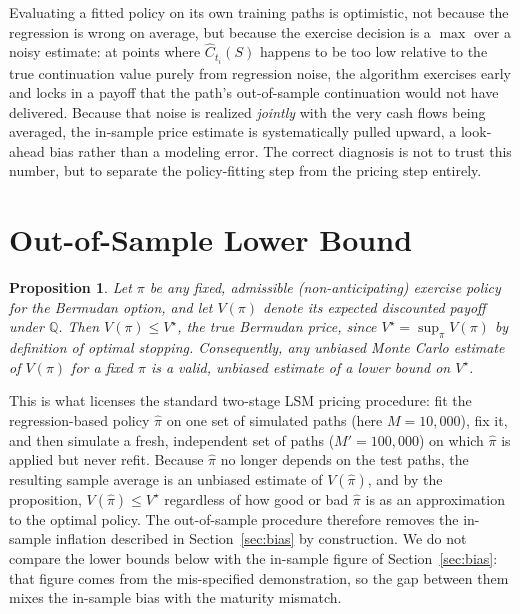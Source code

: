 \documentclass[11pt]{article}
\newtheorem{proposition}{Proposition}
\begin{document}
Evaluating a fitted policy on its own training paths is optimistic, not because the regression is wrong on average, but because the exercise decision is a $\max$ over a noisy estimate: at points where $\widehat C_{t_i}(S)$ happens to be too low relative to the true continuation value purely from regression noise, the algorithm exercises early and locks in a payoff that the path's out-of-sample continuation would not have delivered. Because that noise is realized \emph{jointly} with the very cash flows being averaged, the in-sample price estimate is systematically pulled upward, a look-ahead bias rather than a modeling error. The correct diagnosis is not to trust this number, but to separate the policy-fitting step from the pricing step entirely.

\section{Out-of-Sample Lower Bound}
\label{sec:lowerbound}

\begin{proposition}
Let $\pi$ be any fixed, admissible (non-anticipating) exercise policy for the Bermudan option, and let $V(\pi)$ denote its expected discounted payoff under $\mathbb{Q}$. Then $V(\pi) \le V^\star$, the true Bermudan price, since $V^\star = \sup_\pi V(\pi)$ by definition of optimal stopping. Consequently, any unbiased Monte Carlo estimate of $V(\pi)$ for a fixed $\pi$ is a valid, unbiased estimate of a lower bound on $V^\star$.
\end{proposition}

This is what licenses the standard two-stage LSM pricing procedure: fit the regression-based policy $\widehat\pi$ on one set of simulated paths (here $M=10{,}000$), fix it, and then simulate a fresh, independent set of paths ($M'=100{,}000$) on which $\widehat\pi$ is applied but never refit. Because $\widehat\pi$ no longer depends on the test paths, the resulting sample average is an unbiased estimate of $V(\widehat\pi)$, and by the proposition, $V(\widehat\pi) \le V^\star$ regardless of how good or bad $\widehat\pi$ is as an approximation to the optimal policy. The out-of-sample procedure therefore removes the in-sample inflation described in Section~\ref{sec:bias} by construction. We do not compare the lower bounds below with the in-sample figure of Section~\ref{sec:bias}: that figure comes from the mis-specified demonstration, so the gap between them mixes the in-sample bias with the maturity mismatch.
\end{document}
